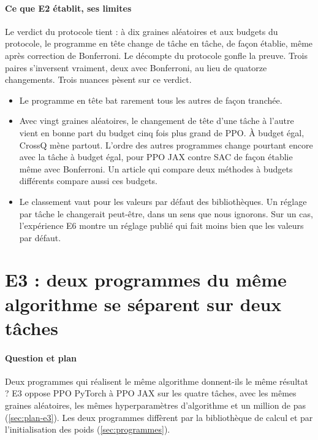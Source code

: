 \paragraph{Ce que E2 établit, ses limites}
Le verdict du protocole tient : à dix graines aléatoires et aux budgets du protocole, le programme en tête
change de tâche en tâche, de façon établie, même après correction de Bonferroni. Le décompte du protocole
gonfle la preuve. Trois paires s'inversent vraiment, deux avec Bonferroni, au lieu de quatorze changements.
Trois nuances pèsent sur ce verdict.
\begin{itemize}
  \item Le programme en tête bat rarement tous les autres de façon tranchée.
  \item Avec vingt graines aléatoires, le changement de tête d'une tâche à l'autre vient en bonne part du
    budget cinq fois plus grand de PPO. À budget égal, CrossQ mène partout. L'ordre des autres programmes
    change pourtant encore avec la tâche à budget égal, pour PPO JAX contre SAC de façon établie même avec
    Bonferroni. Un article qui compare deux méthodes à budgets différents compare aussi ces budgets.
  \item Le classement vaut pour les valeurs par défaut des bibliothèques. Un réglage par tâche le changerait
    peut-être, dans un sens que nous ignorons. Sur un cas, l'expérience E6 montre un réglage publié qui fait
    moins bien que les valeurs par défaut.
\end{itemize}

\section{E3 : deux programmes du même algorithme se séparent sur deux tâches}\label{sec:e3}

\paragraph{Question et plan}
Deux programmes qui réalisent le même algorithme donnent-ils le même résultat ? E3 oppose PPO PyTorch à PPO
JAX sur les quatre tâches, avec les mêmes graines aléatoires, les mêmes hyperparamètres d'algorithme et un million de pas
(\cref{sec:plan-e3}). Les deux programmes diffèrent par la bibliothèque de calcul et par l'initialisation des
poids (\cref{sec:programmes}).

